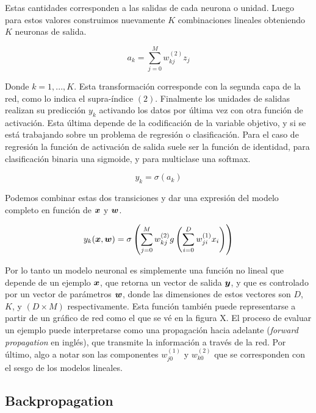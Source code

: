 Estas cantidades corresponden a las salidas de cada neurona o unidad. Luego para
estos valores construimos nuevamente $K$ combinaciones lineales obteniendo $K$
neuronas de salida.

\begin{equation}
    a_k = \sum_{j=0}^{M} w_{kj}^{(2)}z_j
\end{equation}

Donde $k= 1,..., K$. Esta transformación corresponde con la segunda capa de la
red, como lo indica el supra-índice $(2)$. Finalmente los unidades de salidas
realizan su predicción $y_k$ activando los datos por última vez con otra función
de activación. Esta última depende de la codificación de la variable objetivo, y
si se está trabajando sobre un problema de regresión o clasificación. Para el
caso de regresión la función de activación de salida suele ser la función de
identidad, para clasificación binaria una sigmoide, y para multiclase una softmax.

\begin{equation}
    y_{k} = \sigma\left( a_k \right)
\end{equation}

Podemos combinar estas dos transiciones y dar una expresión del modelo completo
en función de $\boldsymbol{x}$ y $\boldsymbol{w}$.

\begin{equation}
    y_k(\boldsymbol{x}, \boldsymbol{w}) = \sigma\left(
                \sum_{j=0}^{M} w_{kj}^{(2)}
                    g\left( \sum_{i = 0}^{D} w_{ji}^{(1)} x_{i}
                \right)
            \right)
\end{equation}

Por lo tanto un modelo neuronal es simplemente una función no lineal que depende
de un ejemplo $\boldsymbol{x}$, que retorna un vector de salida $\boldsymbol{y}$, y que es
controlado por un vector de parámetros $\boldsymbol{w}$, donde las dimensiones de
estos vectores son $D$, $K$, y $(D \times M)$ respectivamente. Esta función
también puede representarse a partir de un gráfico de red como el que se vé en
la figura X. El proceso de evaluar un ejemplo puede interpretarse como una
propagación hacia adelante (\emph{forward propagation} en inglés), que transmite
la información a través de la red. Por último, algo a notar son las componentes
$w_{j0}^{(1)}$ y $w_{k0}^{(2)}$ que se corresponden con el sesgo de los modelos
lineales.

\subsection{Backpropagation}

